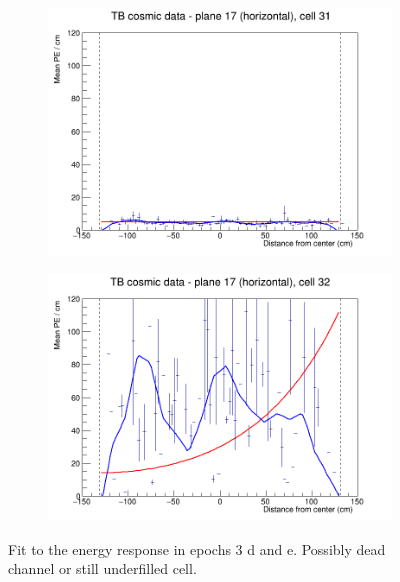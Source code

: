 \documentclass[12pt,a4paper]{article}
\begin{document}
\begin{figure}[h]
  \begin{subfigure}{0.5\textwidth}
    \includegraphics[width=\linewidth]{RelativeCalibrationResults/ep3de_017_031.png}
  \end{subfigure}
  \begin{subfigure}{0.5\textwidth}
    \includegraphics[width=\linewidth]{RelativeCalibrationResults/ep3de_017_032.png}
  \end{subfigure}
  \caption{Fit to the energy response in epochs 3 d and e. Possibly dead channel or still underfilled cell.}
  \label{figAttenfitResultsEpoch3de_LeftoverUnderfilledCell}
\end{figure}
\end{document}

